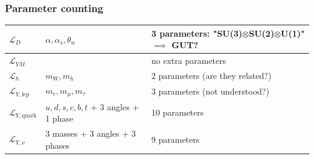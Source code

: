 \subsubsection{Parameter counting}
\begin{table}[H]
\begin{tabular}{l|l|l}
\centering
$\mathcal{L}_D$ & $\alpha, \alpha_s, \theta_w$ & 3 parameters: "SU(3)$\otimes$SU(2)$\otimes$U(1)" $\implies$ GUT? \\ \hline
$\mathcal{L}_{YM}$  &                                                                       
& no extra parameters\\ \hline
$\mathcal{L}_h$    &                                                                       $m_W, m_h$ & 2 parameters (are they related?)  \\ \hline
$\mathcal{L}_{Y, \text{lep}}$  &                                                                           $m_e, m_\mu, m_\tau$ & 3 parameters (not understood?) \\ \hline
$\mathcal{L}_{Y, \text{quark}}$ &                                                                           $u, d, s, c, b, t$ + 3 angles + 1 phase & 10 parameters  \\ \hline
$\mathcal{L}_{Y, \nu}$ & 3 masses + 3 angles + 3 phases                                                              &  9 parameters                  
\end{tabular}
\end{table}
